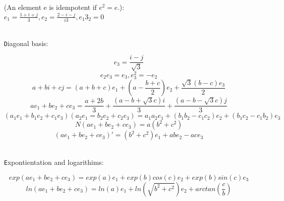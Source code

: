 \documentclass[a4paper]{article}
\begin{document}
(An element e is idempotent if $ e^{2} = e $.): \\
$ e_{1} = \frac{1+i+j}{3}, e_{2} = \frac{2-i-j}{i3},e_{1}3_{2}=0 $ \\ \\
\begin{ttfamily}
\texttt Diagonal basis:
\end{ttfamily}
\[ e_{3}=\frac{i-j}{\sqrt{3}} \]
\[ e_{2}e_{3} = e_{3}, e_{3}^{2}=-e_{2} \]
\[ a+bi+cj=(a+b+c)e_{1}+(a-\frac{b+c}{2})e_{2}+\frac{\sqrt{3}(b-c)e_{3}}{2} \]
\[ ae_{1} + be_{2} + ce_{3}=\frac{a+2b}{3}+\frac{(a-b+\sqrt{3}c)i}{3}+\frac{(a-b-\sqrt{3}c)j}{3} \]
\[ (a_{1}e_{1}+b_{1}e_{2}+c_{1}e_{3})(a_{2}e_{1}=b_{2}e_{2}+c_{2}e_{3})=a_{1}a_{2}e_{1}+(b_{1}b_{2}-c_{1}c_{2})e_{2}+(b_{1}c_{2}-c_{1}b_{2})e_{3}\]
\[ N(ae_{1}+be_{2}+ce_{3})=a(b^{2}+c^{2}) \]
\[ (ae_{1}+be_{2}+ce_{3})'=(b^{2}+c^{2})e_{1}+abe_{2}-ace_{3} \] \\
\begin{ttfamily}
\texttt Expontientation and logarithims:
\end{ttfamily}
\[ exp(ae_{1}+be_{2}+ce_{3})=exp(a)e_{1}+exp(b)cos(c)e_{2}+exp(b)sin(c)e_{3} \]
\[ ln(ae_{1}+be_{2}+ce_{3})=ln(a)e_{1}+ln(\sqrt{b^{2}+c^{2}})e_{2}+arctan(\frac{c}{b}) \]
\end{document}
